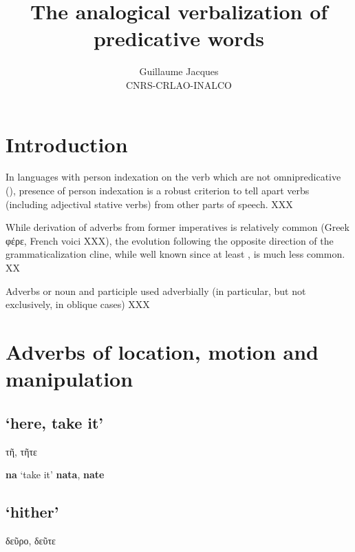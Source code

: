 \documentclass[11pt]{article}
\newcommand{\ipa}[1]{{\phon\textbf{#1}}}
\newcommand{\grec}[1]{{\mleccha #1}}
\begin{document}
 
\title{The analogical verbalization of predicative words}
\author{Guillaume Jacques\\ CNRS-CRLAO-INALCO}
\maketitle

\section*{Introduction}



In languages with person indexation on the verb which are not omnipredicative (\citealt{launey94}), presence of person indexation is a robust criterion to tell apart verbs (including adjectival stative verbs) from other parts of speech. XXX


While derivation of adverbs from former imperatives is relatively common (Greek \grec{φέρε}, French voici XXX), the evolution following the opposite direction of the grammaticalization cline, while well known since at least \citet[414]{pott1859}, is much less common. XX


Adverbs or noun and participle used adverbially (in particular, but not exclusively, in oblique cases) XXX

\section{Adverbs of location, motion and manipulation}

\subsection{`here, take it'}
\citet[114]{viti15wandel}
\grec{τῆ}, \grec{τῆτε}

\citet[156]{miklosisch1883}
\ipa{na} `take it' \ipa{nata}, \ipa{nate}


\subsection{`hither'}

\grec{δεῦρο}, \grec{δεῦτε}
\end{document}
